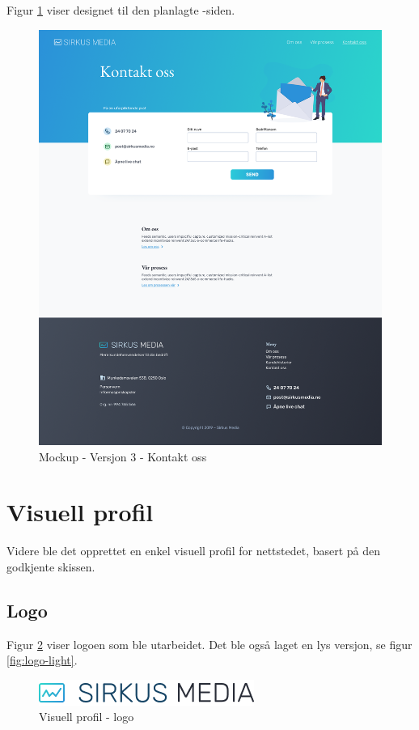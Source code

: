 Figur \ref{fig:mockup-v3-contact} viser designet til den planlagte -siden.
\begin{figure}[H]
    \centering
    \includegraphics[width=\textwidth]{design/mockup3-contact.png}
    \caption{Mockup - Versjon 3 - Kontakt oss}
    \label{fig:mockup-v3-contact}
\end{figure}

\section{Visuell profil}
Videre ble det opprettet en enkel visuell profil for nettstedet, basert på den godkjente skissen.

\subsection{Logo}
Figur \ref{fig:logo-default} viser logoen som ble utarbeidet. Det ble også laget en lys versjon, se figur \ref{fig:logo-light}.

\begin{figure}[H]
    \centering
    \includegraphics[width=.5\textwidth]{design/logo.png}
    \caption{Visuell profil - logo}
    \label{fig:logo-default}
\end{figure}

